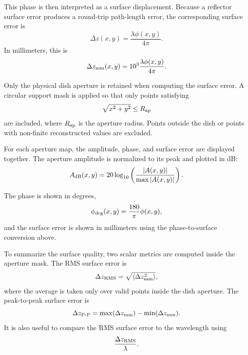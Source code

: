 \documentclass[12pt]{extarticle}
\begin{document}
This phase is then interpreted as a surface displacement. Because a reflector
surface error produces a round-trip path-length error, the corresponding surface
error is
\begin{equation}
\Delta z(x,y) = \frac{\lambda \phi(x,y)}{4\pi}.
\end{equation}
In millimeters, this is
\begin{equation}
\Delta z_{\rm mm}(x,y)
=
10^3 \frac{\lambda \phi(x,y)}{4\pi}.
\end{equation}

Only the physical dish aperture is retained when computing the surface error.
A circular support mask is applied so that only points satisfying
\begin{equation}
\sqrt{x^2+y^2} \le R_{\rm ap}
\end{equation}
are included, where \(R_{\rm ap}\) is the aperture radius. Points outside the
dish or points with non-finite reconstructed values are excluded.

For each aperture map, the amplitude, phase, and surface error are displayed
together. The aperture amplitude is normalized to its peak and plotted in dB:
\begin{equation}
A_{\rm dB}(x,y)
=
20\log_{10}
\left(
\frac{|A(x,y)|}{\max |A(x,y)|}
\right).
\end{equation}

The phase is shown in degrees,
\begin{equation}
\phi_{\rm deg}(x,y)
=
\frac{180}{\pi}\phi(x,y),
\end{equation}
and the surface error is shown in millimeters using the phase-to-surface
conversion above.

To summarize the surface quality, two scalar metrics are computed inside the
aperture mask. The RMS surface error is
\begin{equation}
\Delta z_{\rm RMS}
=
\sqrt{
\left\langle
\Delta z_{\rm mm}^2
\right\rangle
},
\end{equation}
where the average is taken only over valid points inside the dish aperture. The
peak-to-peak surface error is
\begin{equation}
\Delta z_{\rm P\text{-}P}
=
\max(\Delta z_{\rm mm})
-
\min(\Delta z_{\rm mm}).
\end{equation}
It is also useful to compare the RMS surface error to the wavelength using
\begin{equation}
\frac{\Delta z_{\rm RMS}}{\lambda}.
\end{equation}
\end{document}
